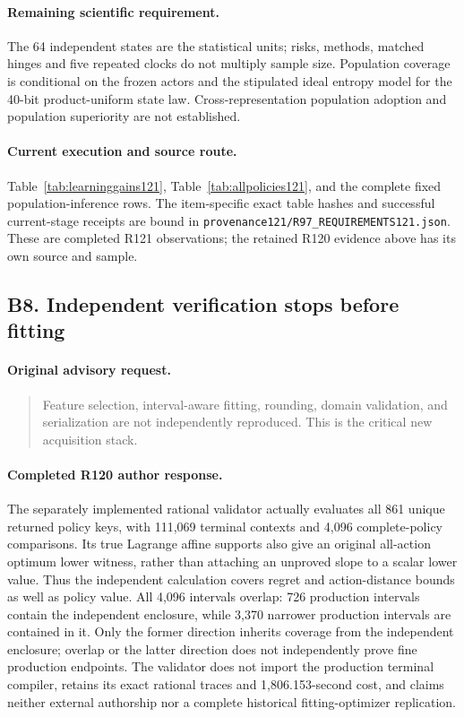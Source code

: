 \paragraph{Remaining scientific requirement.}
The 64 independent states are the statistical units; risks, methods, matched hinges and five repeated clocks do not multiply sample size. Population coverage is conditional on the frozen actors and the stipulated ideal entropy model for the 40-bit product-uniform state law. Cross-representation population adoption and population superiority are not established.

\paragraph{Current execution and source route.}
Table~\ref{tab:learninggains121}, Table~\ref{tab:allpolicies121}, and the complete fixed population-inference rows.
The item-specific exact table hashes and successful current-stage receipts are bound in \nolinkurl{provenance121/R97_REQUIREMENTS121.json}. These are completed R121 observations; the retained R120 evidence above has its own source and sample.

\subsection{B8. Independent verification stops before fitting}
\label{response121:B8}

\paragraph{Original advisory request.}
\begin{quote}
Feature selection, interval-aware fitting, rounding, domain validation, and serialization are not independently reproduced. This is the critical new acquisition stack.
\end{quote}

\paragraph{Completed R120 author response.}
The separately implemented rational validator actually evaluates all 861 unique returned policy keys, with 111,069 terminal contexts and 4,096 complete-policy comparisons. Its true Lagrange affine supports also give an original all-action optimum lower witness, rather than attaching an unproved slope to a scalar lower value. Thus the independent calculation covers regret and action-distance bounds as well as policy value. All 4,096 intervals overlap: 726 production intervals contain the independent enclosure, while 3,370 narrower production intervals are contained in it. Only the former direction inherits coverage from the independent enclosure; overlap or the latter direction does not independently prove fine production endpoints. The validator does not import the production terminal compiler, retains its exact rational traces and 1,806.153-second cost, and claims neither external authorship nor a complete historical fitting-optimizer replication.

